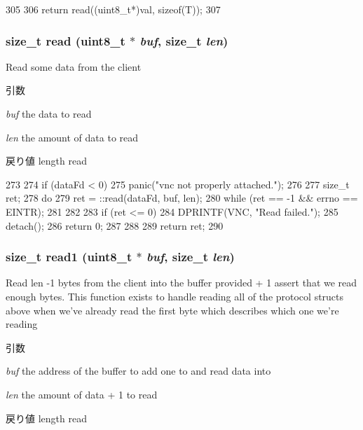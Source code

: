 \begin{DoxyCode}
305 {
306     return read((uint8_t*)val, sizeof(T));
307 }
\end{DoxyCode}
\hypertarget{classVncServer_a9f8a094b410fa145da19663f83f241e3}{
\subsubsection[{read}]{\setlength{\rightskip}{0pt plus 5cm}size\_\-t read (uint8\_\-t $\ast$ {\em buf}, \/  size\_\-t {\em len})}}
\label{classVncServer_a9f8a094b410fa145da19663f83f241e3}
Read some data from the client 
\begin{DoxyParams}{引数}
\item[{\em buf}]the data to read \item[{\em len}]the amount of data to read \end{DoxyParams}
\begin{DoxyReturn}{戻り値}
length read 
\end{DoxyReturn}



\begin{DoxyCode}
273 {
274     if (dataFd < 0)
275         panic("vnc not properly attached.\n");
276 
277     size_t ret;
278     do {
279         ret = ::read(dataFd, buf, len);
280     } while (ret == -1 && errno == EINTR);
281 
282 
283     if (ret <= 0){
284         DPRINTF(VNC, "Read failed.\n");
285         detach();
286         return 0;
287     }
288 
289     return ret;
290 }
\end{DoxyCode}
\hypertarget{classVncServer_ab265cdc9659b04aafe0b93e866024a6d}{
\subsubsection[{read1}]{\setlength{\rightskip}{0pt plus 5cm}size\_\-t read1 (uint8\_\-t $\ast$ {\em buf}, \/  size\_\-t {\em len})}}
\label{classVncServer_ab265cdc9659b04aafe0b93e866024a6d}
Read len -\/1 bytes from the client into the buffer provided + 1 assert that we read enough bytes. This function exists to handle reading all of the protocol structs above when we've already read the first byte which describes which one we're reading 
\begin{DoxyParams}{引数}
\item[{\em buf}]the address of the buffer to add one to and read data into \item[{\em len}]the amount of data + 1 to read \end{DoxyParams}
\begin{DoxyReturn}{戻り値}
length read 
\end{DoxyReturn}



